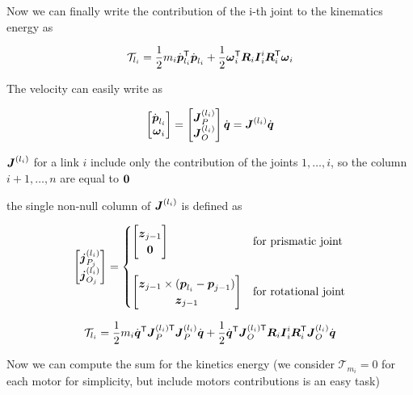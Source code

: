 Now we can finally write the contribution of the i-th joint to the kinematics energy as

\[
	\mathcal{T}_{l_i} =
	\frac{1}{2} m_i \dot{\boldsymbol{p}}_{l_i}^{\mathsf{T}} \dot{\boldsymbol{p}}_{l_i} +
	\frac{1}{2} \boldsymbol{\omega}_i^{\mathsf{T}} \boldsymbol{R}_i \boldsymbol{I}_i^i \boldsymbol{R}_i^{\mathsf{T}} \boldsymbol{\omega}_i
\]

The velocity can easily write as

\[
	\begin{bmatrix}
		\dot{\boldsymbol{p}}_{l_i} \\
		\boldsymbol{\omega}_i
	\end{bmatrix} =
	\begin{bmatrix}
		\boldsymbol{J}_P^{(l_i)} \\
		\boldsymbol{J}_O^{(l_i)}
	\end{bmatrix} \dot{\boldsymbol{q}} =
	\boldsymbol{J}^{(l_i)} \dot{\boldsymbol{q}}
\]

\begin{nb}$\boldsymbol{J}^{(l_i)}$ for a link $i$ include only the contribution of the joints $1, \dots, i$, so the column $i+1,\dots,n$ are equal to $\boldsymbol{0}$\end{nb}

the single non-null column of $\boldsymbol{J}^{(l_i)}$ is defined as

\[
	\begin{bmatrix}
		\boldsymbol{j}_{P_j}^{(l_i)} \\
		\boldsymbol{j}_{O_j}^{(l_i)}
	\end{bmatrix} =
	\begin{cases}
		\begin{bmatrix}
			\boldsymbol{z}_{j-1} \\
			\boldsymbol{0}
		\end{bmatrix} & \text{for prismatic joint} \\\\
		\begin{bmatrix}
			\boldsymbol{z}_{j-1} \times (\boldsymbol{p}_{l_i} - \boldsymbol{p}_{j-1}) \\
			\boldsymbol{z}_{j-1}
		\end{bmatrix} & \text{for rotational joint} \\
	\end{cases}
\]


\[
	\mathcal{T}_{l_i} =
	\frac{1}{2} m_i \dot{\boldsymbol{q}}^{\mathsf{T}} \boldsymbol{J}_P^{(l_i)\mathsf{T}} \boldsymbol{J}_P^{(l_i)} \dot{\boldsymbol{q}} +
	\frac{1}{2} \dot{\boldsymbol{q}}^{\mathsf{T}} \boldsymbol{J}_O^{(l_i)\mathsf{T}} \boldsymbol{R}_i \boldsymbol{I}_i^i \boldsymbol{R}_i^{\mathsf{T}} \boldsymbol{J}_O^{(l_i)} \dot{\boldsymbol{q}}
\]

Now we can compute the sum for the kinetics energy (we consider $\mathcal{T}_{m_i} = 0$ for each motor for simplicity, but include motors contributions is an easy task)

